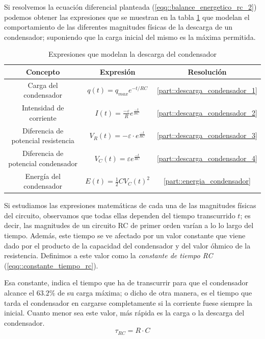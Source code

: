 \documentclass[../main.tex]{subfiles}
\begin{document}
Si resolvemos la ecuación diferencial planteada (\ref{eqq::balance_energetico_rc_2}) podemos obtener las expresiones que se muestran en la tabla \ref{tab::ecuaciones_descarga_rc} que modelan el comportamiento de las diferentes magnitudes físicas de la descarga de un condensador; suponiendo que la carga inicial del mismo es la máxima permitida.\\



\begin{table}[!ht]
    \begin{center}
        \begin{tabular}{|| c | c | c ||}
            \hline
            \textbf{Concepto} & \textbf{Expresión} &  \textbf{Resolución}\\ \hline
            Carga del condensador & $q(t) = q_{max} e^{-t/{RC}}$ & \ref{part::descarga_condensador_1} \\
            Intensidad de corriente & $I(t) = \frac{-\varepsilon}{R}e^{\frac{-t}{RC}}$ & \ref{part::descarga_condensador_2} \\
            Diferencia de potencial resistencia & $V_R(t) = -\varepsilon \cdot e^{\frac{-t}{RC}}$ & \ref{part::descarga_condensador_3} \\ 
            Diferencia de potencial condensador & $V_C(t) = \varepsilon   e^{\frac{-t}{RC}}$ & \ref{part::descarga_condensador_4} \\ 
            Energía del condensador & $E(t) = \frac{1}{2}CV_C(t)^2 $ & \ref{part::energia_condensador} \\
            \hline
            \end{tabular}
            \caption{Expresiones que modelan la descarga del condensador}
            \label{tab::ecuaciones_descarga_rc}
    \end{center}
\end{table}


\newpage
Si estudiamos las expresiones matemáticas de cada una de las magnitudes físicas del circuito, observamos que todas ellas dependen del tiempo transcurrido $t$; es decir, las magnitudes de un circuito RC de primer orden varían a lo lo largo del tiempo. Además, este tiempo se ve afectado por un valor constante que viene dado por el producto de la capacidad del condensador y del valor óhmico de la resistencia. Definimos a este valor como la \textit{constante de tiempo RC} (\ref{eqq::constante_tiempo_rc}). 

Esa constante, indica el tiempo que ha de transcurrir para que el condensador alcance el $63.2\%$ de su carga máxima; o dicho de otra manera, es el tiempo que tarda el condensador en cargarse completamente si la corriente fuese siempre la inicial. Cuanto menor sea este valor, más rápida es la carga o la descarga del condensador.
\begin{equation}
    \tau_{RC} = R \cdot C
    \label{eqq::constante_tiempo_rc}
\end{equation}
\end{document}
